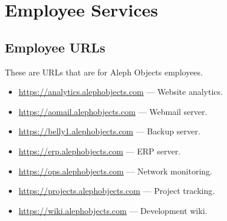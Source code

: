 %
%
%
%
%

\section{Employee Services}
\subsection{Employee URLs}
These are URLs that are for Aleph Objects employees.

\begin{itemize}
\item \url{https://analytics.alephobjects.com} --- Website analytics.
\item \url{https://aomail.alephobjects.com} --- Webmail server.
\item \url{https://belly1.alephobjects.com} --- Backup server.
\item \url{https://erp.alephobjects.com} --- ERP server.
\item \url{https://ops.alephobjects.com} --- Network monitoring.
\item \url{https://projects.alephobjects.com} --- Project tracking.
\item \url{https://wiki.alephobjects.com} --- Development wiki.
\end{itemize}

